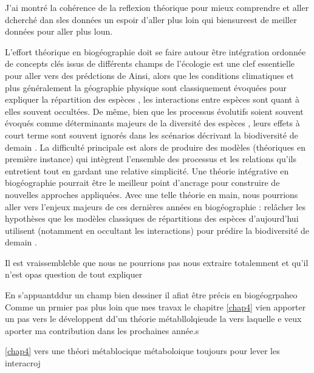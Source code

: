 J'ai montré la cohérence de la reflexion théorique pour mieux comprendre
et aller dcherché dan sles données un espoir d'aller plus loin qui
biensureest de meiller données pour aller plus loun.

L'effort théorique en biogéographie doit se faire autour être
intégration ordonnée de concepts clés issus de différents champs de
l'écologie \citep{Thuiller2013} est une clef essentielle pour aller vers
des prédctions de Ainsi, alors que les conditions climatiques et plus
généralement la géographie physique sont classiquement évoquées pour
expliquer la répartition des espèces \cite{Kearney2004}, les
interactions entre espèces sont quant à elles souvent occultées. De
même, bien que les processus évolutifs soient souvent évoqués comme
déterminants majeurs de la diversité des espèces \cite{Rosindell2011},
leurs effets à court terme sont souvent ignorés \cite{Parmesan2006} dans
les scénarios décrivant la biodiversité de demain \cite{Lavergne2010}.
La difficulté principale est alors de produire des modèles (théoriques
en première instance) qui intègrent l'ensemble des processus et les
relations qu'ils entretient \cite{Thuiller2013} tout en gardant une
relative simplicité. Une théorie intégrative en biogéographie pourrait
être le meilleur point d'ancrage pour construire de nouvelles approches
appliquées. Avec une telle théorie en main, nous pourrions aller vers
l'enjeux majeurs de ces dernières années en biogéographie : relâcher les
hypothèses que les modèles classiques de répartitions des espèces
d'aujourd'hui utilisent (notamment en occultant les interactions) pour
prédire la biodiversité de demain \cite{Guisan2011}.

Il est vraissembleble que nous ne pourrions pas nous extraire
totalemnent et qu'il n'est opas question de tout expliquer
\citep{Gravel2011a}

En s'appuantddur un champ bien dessiner il afiat être précis en
biogéogrpaheo Comme un prmier pas plus loin que mes travax le chapitre
\ref{chap4} vien apporter un pas vers le développent dd'un théorie
métabllolqieude la vers laquelle e veux aporter ma contribution dans les
prochaines année.s

\ref{chap4} vers une théori métablocique métaboloique toujours pour
lever les interacroj
